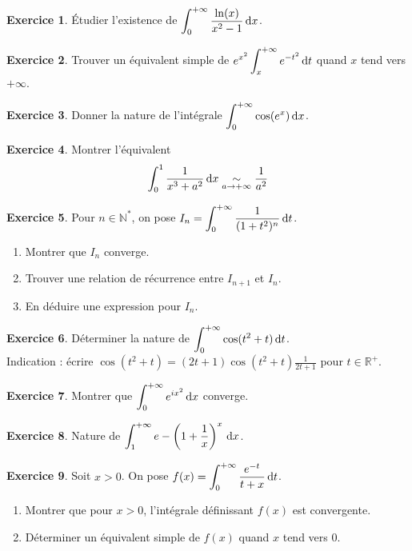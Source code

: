 \documentclass[12pt,a4paper]{book}
\renewcommand{\d}{{\, \rm d}}
\theoremstyle{definition}
\newtheorem{exo}{Exercice}[section]
\theoremstyle{remark}
\newcommand{\N}{\mathbb{N}}
\newcommand{\R}{\mathbb{R}}
\renewcommand{\d}{{\rm \, d}}
\begin{document}
\begin{exo}
    Étudier l'existence de $\displaystyle \int_0^{+\infty} \frac{\ln(x)}{x^2 - 1} \d x$.
\end{exo}

\begin{exo}
    Trouver un équivalent simple de $\displaystyle e^{x^2}\int_x^{+\infty} e^{-t^2} \d t$ quand $x$ tend vers $+\infty$.
\end{exo}

\begin{exo}
    Donner la nature de l'intégrale $\displaystyle \int_{0}^{+\infty} \cos(e^x) \d x$.
\end{exo}

\begin{exo}
    Montrer l'équivalent
    \[\int_0^1 \frac{1}{x^3 + a^2} \d x \underset{a \to +\infty}{\sim} \frac{1}{a^2}\]
\end{exo}

\begin{exo}
    Pour $n \in \N^*$, on pose $\displaystyle I_n = \int_0^{+\infty} \frac{1}{(1+t^2)^n} \d t$.
    \begin{enumerate}
        \item Montrer que $I_n$ converge.
        \item Trouver une relation de récurrence entre $I_{n+1}$ et $I_n$.
        \item En déduire une expression pour $I_n$.
    \end{enumerate}
\end{exo}

\begin{exo}
    Déterminer la nature de $\displaystyle \int_0^{+\infty} \cos(t^2 + t) \d t$. \\
    Indication : écrire $\cos(t^2 + t) = (2t+1)\cos(t^2 + t)\frac{1}{2t+1}$ pour $t \in \R^+$.
\end{exo}

\begin{exo}
    Montrer que $\displaystyle \int_0^{+\infty} e^{ix^2} \d x$ converge.
\end{exo}

\begin{exo}
    Nature de $\displaystyle \int_1^{+\infty} e - \left(1 + \frac{1}{x}\right)^x \d x$.
\end{exo}

\begin{exo}
    Soit $x > 0$. On pose $f(x) = \displaystyle \int_0^{+\infty} \frac{e^{-t}}{t + x} \d t$.
    \begin{enumerate}
        \item Montrer que pour $x > 0$, l'intégrale définissant $f(x)$ est convergente.
        \item Déterminer un équivalent simple de $f(x)$ quand $x$ tend vers 0.
    \end{enumerate}
\end{exo}
\end{document}
